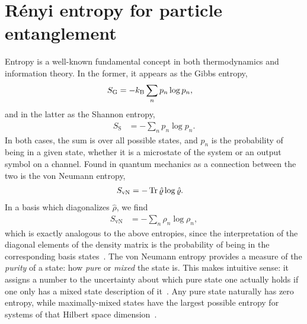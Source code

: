 \chapter{Rényi entropy for particle entanglement}

\label{chap:renyi}

Entropy is a well-known fundamental concept in both thermodynamics and information theory.
In the former, it appears as the Gibbs entropy,~\cite[48]{mcquarrie1976statistical}
\begin{align}
	S_\mathrm{G}
	&= -k_\mathrm{B} \sum_n p_n \log{p_n},
\end{align}
and in the latter as the Shannon entropy,~\cite{shannon1948mathematical}
\begin{align}
	S_\mathrm{S}
	&= -\sum_n p_n \log{p_n}.
\end{align}
In both cases, the sum is over all possible states, and $p_n$ is the probability of being in a given state, whether it is a microstate of the system or an output symbol on a channel.
Found in quantum mechanics as a connection between the two is the von Neumann entropy,~\cite[253]{wilde2013quantum}
\begin{align}
	S_\mathrm{vN}
	&= -\operatorname{Tr}{\hat{\varrho} \log{\hat{\varrho}}}.
\end{align}
In a basis which diagonalizes $\hat{\rho}$, we find
\begin{align}
	S_\mathrm{vN}
	&= -\sum_n \rho_n \log{\rho_n},
\end{align}
which is exactly analogous to the above entropies, since the interpretation of the diagonal elements of the density matrix is the probability of being in the corresponding basis states~\cite[102]{wilde2013quantum}.
The von Neumann entropy provides a measure of the \emph{purity} of a state: how \emph{pure} or \emph{mixed} the state is.
This makes intuitive sense: it assigns a number to the uncertainty about which pure state one actually holds if one only has a mixed state description of it~\cite[254]{wilde2013quantum}.
Any pure state naturally has zero entropy, while maximally-mixed states have the largest possible entropy for systems of that Hilbert space dimension~\cite[255]{wilde2013quantum}.

